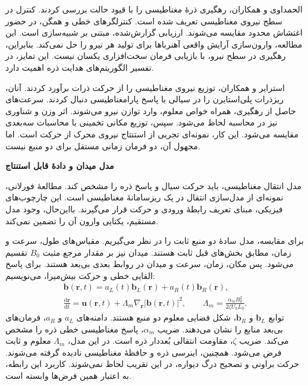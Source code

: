 الحمداوی و همکاران، رهگیری ذرهٔ مغناطیسی را با قیود حالت بررسی کردند.
کنترل در سطح نیروی مغناطیسی تعریف شده است.
کنترلگرهای خطی و همگن، در حضور اغتشاش محدود مقایسه می‌شوند.
ارزیابی گزارش‌شده، مبتنی بر شبیه‌سازی است.
این مطالعه، وارون‌سازی آرایش واقعی آهنرباها برای تولید هر نیرو را حل نمی‌کند.
بنابراین، رهگیری در سطح نیرو، با بازیابی فرمان سخت‌افزاری یکسان نیست.
این تمایز، در تفسیر الگوریتم‌های هدایت ذره اهمیت دارد.
\cite{ElHamdaoui2026Tracking}

استرایر و همکاران، توزیع نیروی مغناطیسی را از حرکت ذرات برآورد کردند.
آنان، ریزذرات پلی‌استایرن را در سیالی با پاسخ پارامغناطیسی دنبال کردند.
سرعت‌های حاصل از رهگیری، همراه خواص معلوم، وارد توازن نیرو می‌شوند.
اثر وزن و شناوری نیز در محاسبه لحاظ می‌شود.
سپس، توزیع مکانی تخمینی با محاسبات سه‌بعدی مقایسه می‌شود.
این کار، نمونه‌ای تجربی از استنتاج نیروی محرک از حرکت است.
اما مجهول آن، دو فرمان زمانی مستقل برای دو منبع نیست.
\cite{Strayer2024ForceMapping}

\textbf{مدل میدان و دادهٔ قابل استنتاج}

مدل انتقال مغناطیسی، باید حرکت سیال و پاسخ ذره را مشخص کند.
مطالعهٔ فورلانی، نمونه‌ای از مدل‌سازی انتقال در یک ریزسامانهٔ مغناطیسی است.
این چارچوب‌های فیزیکی، مبنای تعریف رابطهٔ ورودی و حرکت قرار می‌گیرند.
بااین‌حال، وجود مدل مستقیم، یکتایی وارون آن را تضمین نمی‌کند.
\cite{Furlani2006Transport}

برای مقایسه، مدل سادهٔ دو منبع ثابت را در نظر می‌گیریم.
مقیاس‌های طول، سرعت و زمان، مطابق بخش‌های قبل ثابت هستند.
میدان نیز بر مقدار مرجع مثبت $B_0$ تقسیم می‌شود.
پس مکان، زمان، سرعت و میدان در روابط بعدی بی‌بعد هستند.
برای پاسخ القایی خطی و حرکت بیش‌میرا، می‌نویسیم:
\begin{equation}
\begin{gathered}
\mathbf b(\mathbf r,t)
=a_L(t)\mathbf b_L(\mathbf r)
+a_R(t)\mathbf b_R(\mathbf r),\\
\frac{\mathrm d\mathbf r}{\mathrm dt}
=\mathbf u(\mathbf r,t)
+\Lambda_m\nabla_{\mathbf r}|\mathbf b(\mathbf r,t)|^2,
\qquad
\Lambda_m=\frac{\alpha_m B_0^2}{2\zeta U_0L_0}.
\end{gathered}
\label{eq:lit-magnetic-dimensionless-observation}
\end{equation}
توابع $\mathbf b_L$ و $\mathbf b_R$، شکل فضایی معلوم دو منبع هستند.
دامنه‌های $a_L$ و $a_R$، فرمان‌های بی‌بعد منابع را نشان می‌دهند.
ضریب $\alpha_m$، پاسخ مغناطیسی خطی ذره را مشخص می‌کند.
ضریب $\zeta$، مقاومت انتقالی بُعددار ذره است.
در این مدل، $\Lambda_m$ معلوم و ثابت فرض می‌شود.
همچنین، اینرسی ذره و حافظهٔ مغناطیسی نادیده گرفته می‌شوند.
حرکت براونی و تصحیح درگ دیواره، در این تقریب لحاظ نمی‌شوند.
کاربرد این رابطه، به اعتبار همین فرض‌ها وابسته است.

